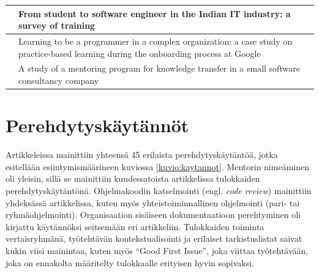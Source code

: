 \documentclass[utf8]{gradu3}
\begin{document}
\begin{footnotesize}
\begin{longtable}{ m{4cm}  m{10.5cm} }
\hline
\textcite{kulkarni-ym-2010} & From student to software engineer in the Indian IT industry: a survey of training \\
\hline
 \textcite{johnson-senges-2010} & Learning to be a programmer in a complex organization: a case study on practice-based learning during the onboarding process at Google\\
\hline
\textcite{bjornson-dingsøyr-2005} & A study of a mentoring program for knowledge transfer in a small software consultancy company \\

\hline
\end{longtable}
\end{footnotesize}


\section{Perehdytyskäytännöt}
\label{luku-tulokset-kaytannot}

Artikkeleissa mainittiin yhteensä 45 erilaista perehdytyskäytäntöä, jotka esitellään esiintymismäärineen kuviossa \ref{kuvio:kaytannot}. Mentorin nimeäminen oli yleisin, sillä se mainittiin kuudessatoista artikkelissa tulokkaiden perehdytyskäytäntönä. Ohjelmakoodin katselmointi (engl. \textit{code review}) mainittiin yhdeksässä artikkelissa, kuten myös yhteistoiminnallinen ohjelmointi (pari- tai ryhmäohjelmointi). Organisaation sisäiseen dokumentaatioon perehtyminen oli kirjattu käytännöksi seitsemään eri artikkeliin. Tulokkaiden toiminta vertaisryhmänä, työtehtävän kontekstualisointi ja erilaiset tarkistuslistat saivat kukin viisi mainintaa, kuten myös ``Good First Issue'', joka viittaa työtehtävään, joka on ennakolta määritelty tulokkaalle erityisen hyvin sopivaksi.
\end{document}
